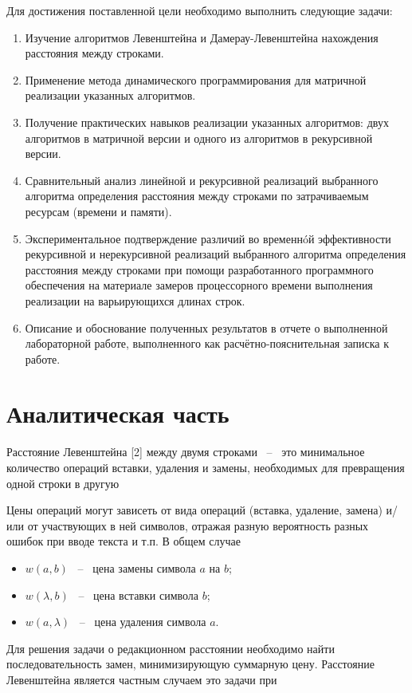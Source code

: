 \documentclass[14pt,russian]{scrartcl}
\begin{document}
Для достижения поставленной цели необходимо выполнить следующие задачи:
\begin{enumerate}
	\item Изучение алгоритмов Левенштейна и Дамерау-Левенштейна нахождения расстояния между строками.
	\item Применение метода динамического программирования для матричной реализации указанных алгоритмов.
	\item Получение практических навыков реализации указанных алгоритмов: двух алгоритмов в матричной версии и одного из алгоритмов в рекурсивной версии.
	\item Сравнительный анализ линейной и рекурсивной реализаций выбранного алгоритма определения расстояния между строками по затрачиваемым ресурсам (времени и памяти).
	\item Экспериментальное подтверждение различий во временнóй эффективности рекурсивной и
	      нерекурсивной реализаций выбранного алгоритма определения расстояния между строками при
	      помощи разработанного программного обеспечения на материале замеров процессорного времени
	      выполнения реализации на варьирующихся длинах строк.
	\item Описание и обоснование полученных результатов в отчете о выполненной лабораторной
	      работе, выполненного как расчётно-пояснительная записка к работе. 
\end{enumerate}

\section{Аналитическая часть}
Расстояние Левенштейна [2] между двумя строками ~--~ это минимальное количество операций вставки, удаления и замены, необходимых для превращения одной строки в другую

Цены операций могут зависеть от вида операций (вставка, удаление, замена) и/или от участвующих в ней символов, отражая разную вероятность разных ошибок при вводе текста и т.п. В общем случае

\begin{itemize}
	\item $w(a, b)$ ~--~ цена замены символа $a$ на $b$;
	\item $w(\lambda, b)$ ~--~ цена вставки символа $b$;
	\item $w(a, \lambda)$ ~--~ цена удаления символа $a$.
\end{itemize}

Для решения задачи о редакционном расстоянии необходимо найти последовательность замен, минимизирующую суммарную цену. Расстояние Левенштейна является частным случаем это задачи при
\end{document}
